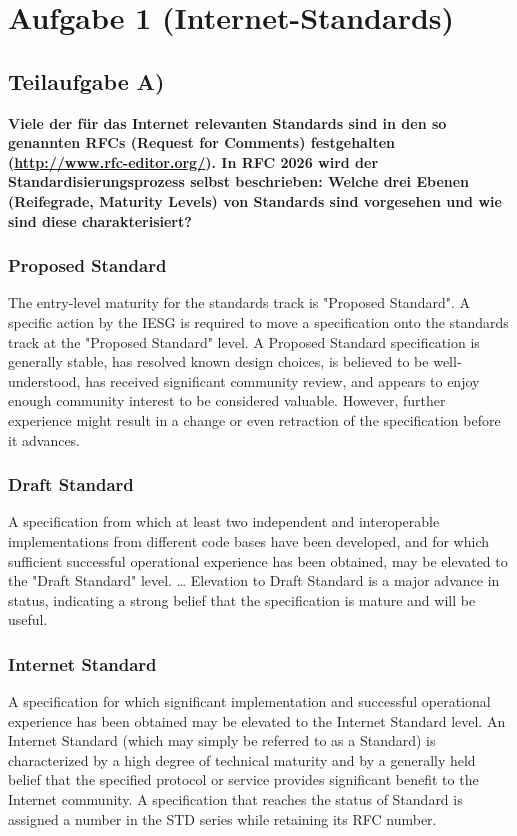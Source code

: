 \section{Aufgabe 1 (Internet-Standards)}

\subsection{Teilaufgabe A)}
\textbf{Viele der für das Internet relevanten Standards sind in den so genannten RFCs (Request
for Comments) festgehalten (\url{http://www.rfc-editor.org/}). In RFC 2026 wird
der Standardisierungsprozess selbst beschrieben: Welche drei Ebenen (Reifegrade, Maturity
Levels) von Standards sind vorgesehen und wie sind diese charakterisiert?}

\subsubsection{Proposed Standard}

The entry-level maturity for the standards track is "Proposed Standard". A specific action by
the IESG is required to move a specification onto the standards track at the "Proposed
Standard" level. A Proposed Standard specification is generally stable, has resolved known
design choices, is believed to be well-understood, has received significant community
review, and appears to enjoy enough community interest to be considered valuable.
However, further experience might result in a change or even retraction of the specification
before it advances.

\subsubsection{Draft Standard}
A specification from which at least two independent and interoperable implementations
from different code bases have been developed, and for which sufficient successful
operational experience has been obtained, may be elevated to the "Draft Standard" level.
… Elevation to Draft Standard is a major advance in status, indicating a strong belief that
the specification is mature and will be useful.

\subsubsection{Internet Standard}
A specification for which significant implementation and successful operational
experience has been obtained may be elevated to the Internet Standard level. An Internet
Standard (which may simply be referred to as a Standard) is characterized by a high degree
of technical maturity and by a generally held belief that the specified protocol or service
provides significant benefit to the Internet community. A specification that reaches the
status of Standard is assigned a number in the STD series while retaining its RFC
number.

